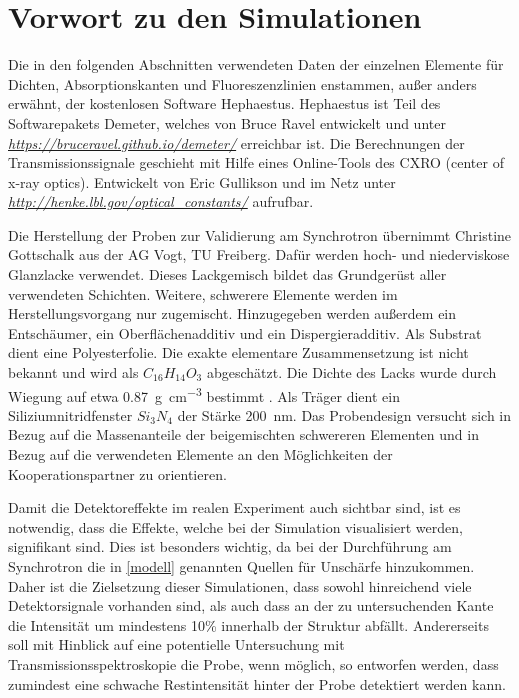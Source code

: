 \section{Vorwort zu den Simulationen} \label{sec:vorwort}
Die in den folgenden Abschnitten verwendeten Daten der einzelnen Elemente für Dichten, Absorptionskanten und Fluoreszenzlinien enstammen, außer anders erwähnt, der kostenlosen Software Hephaestus. Hephaestus ist Teil des Softwarepakets Demeter, welches von Bruce Ravel entwickelt und unter \textit{\url{https://bruceravel.github.io/demeter/}} erreichbar ist. \newline
Die Berechnungen der Transmissionssignale geschieht mit Hilfe eines Online-Tools des CXRO (center of x-ray optics). Entwickelt von Eric Gullikson und im Netz unter \textit{\url{http://henke.lbl.gov/optical_constants/}} aufrufbar.\newline

Die Herstellung der Proben zur Validierung am Synchrotron übernimmt Christine Gottschalk aus der AG Vogt, TU Freiberg. Dafür werden hoch- und niederviskose Glanzlacke verwendet. Dieses Lackgemisch bildet das Grundgerüst aller verwendeten Schichten. Weitere, schwerere Elemente werden im Herstellungsvorgang nur zugemischt. Hinzugegeben werden außerdem ein Entschäumer, ein Oberflächenadditiv und ein Dispergieradditiv. Als Substrat dient eine Polyesterfolie. Die exakte elementare Zusammensetzung ist nicht bekannt und wird als $C_{16}H_{14}O_{3}$ abgeschätzt. Die Dichte des Lacks wurde durch Wiegung auf etwa \SI{0.87}{\gram\per\cubic\centi\meter} bestimmt \cite{christine}. Als Träger dient ein Siliziumnitridfenster $Si_{3}N_{4}$ der Stärke \SI{200}{\nano\meter}. Das Probendesign versucht sich in Bezug auf die Massenanteile der beigemischten schwereren Elementen und in Bezug auf die verwendeten Elemente an den Möglichkeiten der Kooperationspartner zu orientieren.\newline

Damit die Detektoreffekte im realen Experiment auch sichtbar sind, ist es notwendig, dass die Effekte, welche bei der Simulation visualisiert werden, signifikant sind. Dies ist besonders wichtig, da bei der Durchführung am Synchrotron die in \cref{modell} genannten Quellen für Unschärfe hinzukommen. Daher ist die Zielsetzung dieser Simulationen, dass sowohl hinreichend viele Detektorsignale vorhanden sind, als auch dass an der zu untersuchenden Kante die Intensität um mindestens 10\% innerhalb der Struktur abfällt. Andererseits soll mit Hinblick auf eine potentielle Untersuchung mit Transmissionsspektroskopie die Probe, wenn möglich, so entworfen werden, dass zumindest eine schwache Restintensität hinter der Probe detektiert werden kann.\newline

